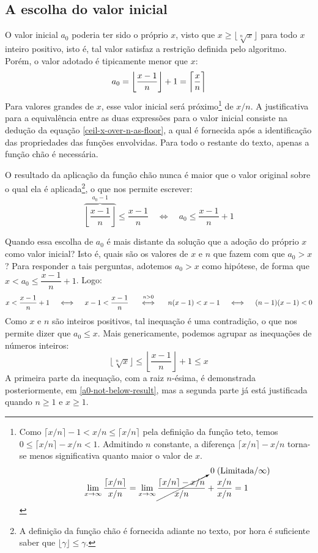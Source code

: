 \subsection*{A escolha do valor inicial}

O valor inicial $a_0$ poderia ter sido o próprio $x$,
visto que $x \ge \lfloor \sqrt[n]{x} \rfloor$
para todo $x$ inteiro positivo,
isto é, tal valor satisfaz a restrição definida pelo algoritmo.
Porém, o valor adotado é tipicamente menor que $x$:
\[
  a_0 = \left\lfloor \dfrac{x - 1}{n} \right\rfloor + 1
      = \left\lceil \dfrac{x\vphantom{l}}{n} \right\rceil
\]
Para valores grandes de $x$, esse valor inicial será próximo\footnote{
  Como $\lceil x/n \rceil - 1 < x/n \le \lceil x/n \rceil$
  pela definição da função teto,
  temos $0 \le \lceil x/n \rceil - x/n < 1$.
  Admitindo $n$ constante, a diferença $\lceil x/n \rceil - x/n$
  torna-se menos significativa quanto maior o valor de $x$.
  \[
    \lim_{x\to\infty} \dfrac{\lceil x/n \rceil}{x/n}
    =
    \lim_{x\to\infty} \cancelto{0\;(\text{Limitada}/\infty)}{
                        \dfrac{\lceil x/n \rceil - x/n}{x/n}
                      } +
                      \dfrac{x/n}{x/n}
    = 1
  \]
}
de $x/n$.
A justificativa para a equivalência
entre as duas expressões para o valor inicial
consiste na dedução da equação \eqref{ceil-x-over-n-as-floor}, a qual
é fornecida após a identificação das propriedades
das funções envolvidas.
Para todo o restante do texto, apenas a função chão é necessária.

O resultado da aplicação da função chão
nunca é maior que o valor original
sobre o qual ela é aplicada\footnote{
  A definição da função chão é fornecida adiante no texto,
  por hora é suficiente saber que $\lfloor \gamma \rfloor \le \gamma$.
},
o que nos permite escrever:
\[
  \overbrace{\left\lfloor \dfrac{x - 1}{n} \right\rfloor}^{a_0 - 1}
  \le \dfrac{x - 1}{n}
  \quad\iff\quad
  a_0 \le \dfrac{x - 1}{n} + 1
\]

Quando essa escolha de $a_0$
é mais distante da solução
que a adoção do próprio $x$ como valor inicial?
Isto é, quais são os valores de $x$ e $n$
que fazem com que $a_0 > x$?
Para responder a tais perguntas,
adotemos $a_0 > x$ como hipótese,
de forma que $x < a_0 \le \dfrac{x - 1}{n} + 1$.
Logo:
\[
  x < \dfrac{x - 1}{n} + 1
  \quad\iff\quad
  x - 1 < \dfrac{x - 1}{n}
  \quad\stackfirst{n > 0}{\iff}\quad
  n(x - 1) < x - 1
  \quad\iff\quad
  (n - 1)(x - 1) < 0
\]
Como $x$ e $n$ são inteiros positivos,
tal inequação é uma contradição,
o que nos permite dizer que $a_0 \le x$.
Mais genericamente,
podemos agrupar as inequações de números inteiros:
\begin{equation}\label{a0-between-result-and-x}
  \lfloor \sqrt[n]{x} \rfloor
  \le
  \left\lfloor \dfrac{x - 1}{n} \right\rfloor + 1
  \le
  x
\end{equation}
A primeira parte da inequação, com a raiz $n$-ésima,
é demonstrada posteriormente, em \eqref{a0-not-below-result},
mas a segunda parte já está justificada quando $n \ge 1$ e $x \ge 1$.
